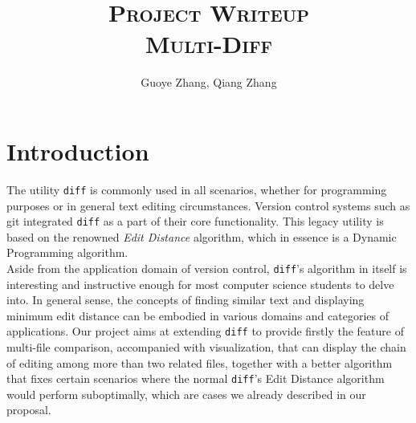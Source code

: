 \documentclass{article}
\begin{document}
\title{\textsc{Project Writeup}\\ \textbf{\textsc{Multi-Diff}}}
\author{Guoye Zhang, Qiang Zhang}
\date{ }
\maketitle

\section{Introduction}
The utility \texttt{diff} is commonly used in all scenarios, whether for programming purposes or in general text editing circumstances. Version control systems such as git integrated \texttt{diff} as a part of their core functionality. This legacy utility is based on the renowned \textit{Edit Distance} algorithm, which in essence is a Dynamic Programming algorithm. \\

Aside from the application domain of version control, \texttt{diff}'s algorithm in itself is interesting and instructive enough for most computer science students to delve into. In general sense, the concepts of finding similar text and displaying minimum edit distance can be embodied in various domains and categories of applications. Our project aims at extending \texttt{diff} to provide firstly the feature of multi-file comparison, accompanied with visualization, that can display the chain of editing among more than two related files, together with a better algorithm that fixes certain scenarios where the normal \texttt{diff}'s Edit Distance algorithm would perform suboptimally, which are cases we already described in our proposal.\\
\end{document}
